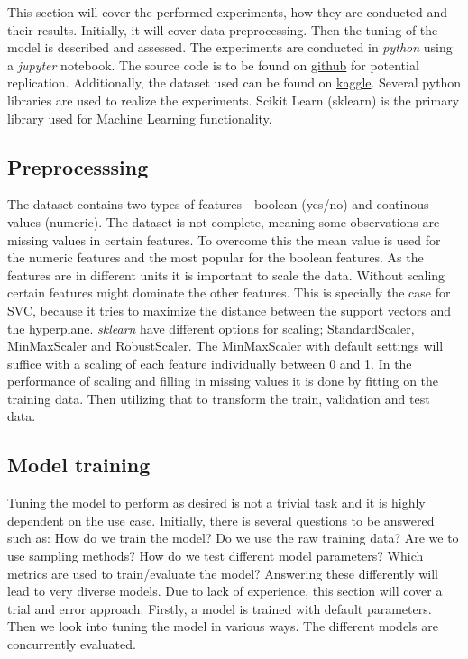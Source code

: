 This section will cover the performed experiments, how they are conducted and their results. Initially, it will cover data preprocessing. Then the tuning of the model is described and assessed. The experiments are conducted in \textit{python} using a \textit{jupyter} notebook. The source code is to be found on \href{https://github.com/mlRosenquist/au-mlr-computer-vision-and-ml/tree/master/project/notebook.ipynb}{github} for potential replication. Additionally, the dataset used can be found on \href{https://www.kaggle.com/competitions/au-ece-cvml2022/data}{kaggle}. Several python libraries are used to realize the experiments. Scikit Learn (sklearn)\cite{scikit-learn} is the primary library used for Machine Learning functionality.         


\subsection{Preprocesssing}
The dataset contains two types of features - boolean (yes/no) and continous values (numeric). The dataset is not complete, meaning some observations are missing values in certain features. To overcome this the mean value is used for the numeric features and the most popular for the boolean features. As the features are in different units it is important to scale the data. Without scaling certain features might dominate the other features. This is specially the case for SVC, because it tries to maximize the distance between the support vectors and the hyperplane. \textit{sklearn} have different options for scaling; StandardScaler, MinMaxScaler and RobustScaler. The MinMaxScaler with default settings will suffice with a scaling of each feature individually between 0 and 1\cite{scikit-learn}. In the performance of scaling and filling in missing values it is done by fitting on the training data. Then utilizing that to transform the train, validation and test data. 

\subsection{Model training}
Tuning the model to perform as desired is not a trivial task and it is highly dependent on the use case. Initially, there is several questions to be answered such as: How do we train the model? Do we use the raw training data? Are we to use sampling methods? How do we test different model parameters? Which metrics are used to train/evaluate the model? Answering these differently will lead to very diverse models. Due to lack of experience, this section will cover a trial and error approach. Firstly, a model is trained with default parameters. Then we look into tuning the model in various ways. The different models are concurrently evaluated. \\

